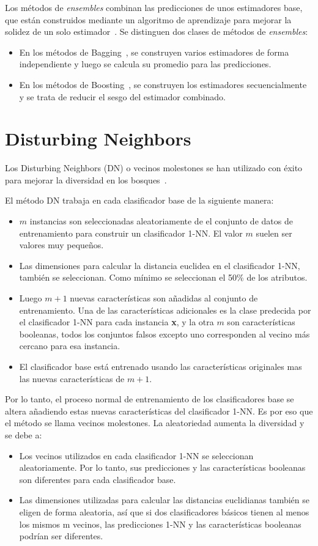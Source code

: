 Los métodos de \textit{ensembles} combinan las predicciones de unos estimadores base, que están construidos mediante un algoritmo de aprendizaje para mejorar la solidez de un solo estimador~\cite{ensemble}.
Se distinguen dos clases de métodos de \textit{ensembles}:
	\begin{itemize}
		\item En los métodos de Bagging~\cite{bagging}, se construyen varios estimadores de forma independiente y luego se calcula su promedio para las predicciones.
		\item En los métodos de Boosting~\cite{boosting}, se construyen los estimadores secuencialmente y se trata de reducir el sesgo del estimador combinado. 
	\end{itemize}

\section{Disturbing Neighbors}

Los Disturbing Neighbors (DN) o vecinos molestones se han utilizado con éxito para mejorar la diversidad en los bosques~\cite{disturbingneighbors}.

El método DN trabaja en cada clasificador base de la siguiente manera:
\begin{itemize}
    \item $m$ instancias son seleccionadas aleatoriamente de el conjunto de datos de entrenamiento para construir un clasificador 1-NN. El valor $m$ suelen ser valores muy pequeños.
    \item Las dimensiones para calcular la distancia euclidea en el clasificador 1-NN, también se seleccionan. Como mínimo se seleccionan el 50\% de los atributos.
    \item Luego $m+1$ nuevas características son añadidas al conjunto de entrenamiento. Una de las características adicionales es la clase predecida por el clasificador 1-NN para cada instancia \textbf{x}, y la otra $m$ son características booleanas, todos los conjuntos falsos excepto uno corresponden al vecino más cercano para esa instancia.
    \item El clasificador base está entrenado usando las características originales mas las nuevas características de $m+1$. 
\end{itemize}
Por lo tanto, el proceso normal de entrenamiento de los clasificadores base se altera añadiendo estas nuevas características del clasificador 1-NN. Es por eso que el método se llama vecinos molestones. La aleatoriedad aumenta la diversidad y se debe a:
\begin{itemize}
\item Los vecinos utilizados en cada clasificador 1-NN se seleccionan aleatoriamente. Por lo tanto, sus predicciones y las características booleanas son diferentes para cada clasificador base.
\item Las dimensiones utilizadas para calcular las distancias euclidianas también se eligen de forma aleatoria, así que si dos clasificadores básicos tienen al menos los mismos m vecinos, las predicciones 1-NN y las características booleanas podrían ser diferentes.
\end{itemize}

